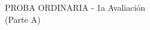 %
\begin{center}
    \large{
    PROBA ORDINARIA - 1a Avaliación}\\
    \vspace*{0.35cm}
    \large (Parte A)
\end{center}
\vspace*{0.15cm}